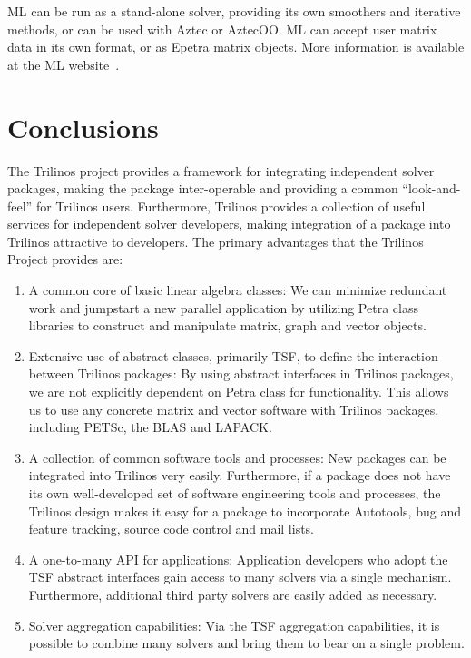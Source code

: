 \documentclass[12pt,relax]{SANDreport}
\begin{document}
ML can be run as a stand-alone solver, providing its own smoothers and iterative methods, or can be used with
Aztec or AztecOO.  ML can accept user matrix data in its own format, or as Epetra matrix objects.  More
information is available at the ML website~\cite{ML-home-page}.

\section{Conclusions}

The Trilinos project provides a framework for integrating independent 
solver packages, making the package inter-operable and providing a common ``look-and-feel'' 
for Trilinos users.  Furthermore, Trilinos provides a collection of useful services for
independent solver developers, making integration of a package into Trilinos 
attractive to developers.
The primary advantages that the Trilinos Project provides are:
\begin{enumerate}
\item A common core of basic linear algebra classes:
We can minimize redundant work and jumpstart a new parallel application
by utilizing Petra class libraries to construct 
and manipulate matrix, graph and vector objects.
\item Extensive use of abstract classes, primarily TSF, to define the interaction between Trilinos
packages:  By using abstract interfaces in Trilinos packages, we are
not explicitly dependent on Petra class for functionality.  This allows us to use any
concrete matrix and vector software with Trilinos packages, including PETSc, the BLAS 
and LAPACK.
\item A collection of common software tools and processes: New packages can be 
integrated into Trilinos very easily.  Furthermore, if a package does not have
its own well-developed set of software engineering tools and processes, the Trilinos
design makes it easy for a package to incorporate Autotools, bug and feature tracking,
source code control and mail lists.
\item A one-to-many API for applications: Application developers who adopt the TSF abstract
interfaces gain access to many solvers via a single mechanism.  Furthermore, additional third
party solvers are easily added as necessary.
\item Solver aggregation capabilities:  Via the TSF aggregation capabilities, it is possible
to combine many solvers and bring them to bear on a single problem.
\end{enumerate}
\end{document}
